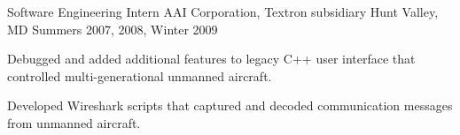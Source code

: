 \begin{cventries}
  \cventry
    {Software Engineering Intern} %
    {AAI Corporation, Textron subsidiary} %
    {Hunt Valley, MD} %
    {Summers 2007, 2008, Winter 2009} %
    {
      \begin{cvitems} %
      \item {Debugged and added additional features to legacy C++ user interface that
          controlled multi-generational unmanned aircraft.}
      \item {Developed Wireshark scripts that captured and decoded communication messages
          from unmanned aircraft.}
      \end{cvitems}
    }

\end{cventries}
